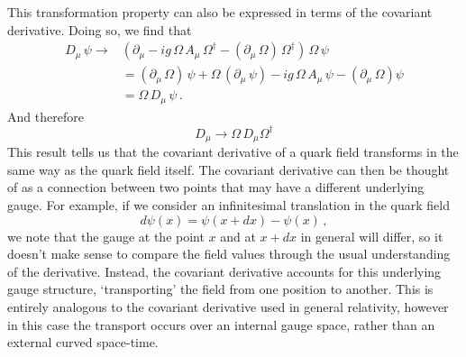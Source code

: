 This transformation property can also be expressed in terms of the covariant derivative. Doing so, we find that
%
\begin{align*}
D_\mu\,\psi \rightarrow &\left(\partial_\mu -ig\,\Omega\,A_\mu\,\Omega^\dag - (\partial_\mu\,\Omega)\,\Omega^\dag\right)\,\Omega\,\psi\\
&= (\partial_\mu\,\Omega)\,\psi + \Omega\,(\partial_\mu\,\psi) - ig\,\Omega\,A_\mu\,\psi - (\partial_\mu\,\Omega)\psi\\
&=\Omega\,D_\mu\,\psi\, .
\end{align*}
%
And therefore
%
\begin{equation}
D_{\mu}\rightarrow\Omega\,D_\mu \Omega^\dag
\end{equation}
%
This result tells us that the covariant derivative of a quark field transforms in the same way as the quark field itself. The covariant derivative can then be thought of as a connection between two points that may have a different underlying gauge. For example, if we consider an infinitesimal translation in the quark field
%
\begin{equation*}
d\psi(x) = \psi(x+dx)-\psi(x)\, ,
\end{equation*} 
%
we note that the gauge at the point $x$ and at $x+dx$ in general will differ, so it doesn't make sense to compare the field values through the usual understanding of the derivative. Instead, the covariant derivative accounts for this underlying gauge structure, `transporting' the field from one position to another. This is entirely analogous to the covariant derivative used in general relativity, however in this case the transport occurs over an internal gauge space, rather than an external curved space-time.\\

